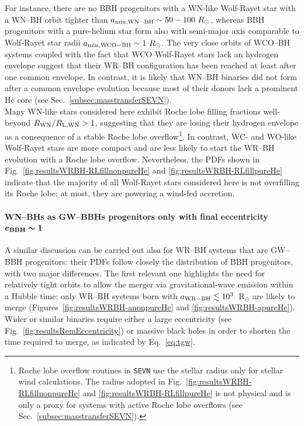 \documentclass[a4paper,titlepage]{book}     	%
\newcommand{\rsun}{R_{\odot}}
\begin{document}
For instance, there are no BBH progenitors with a WN-like Wolf-Rayet star with a WN--BH orbit tighter than $a_{\rm min, WN-BH} \sim 50-100~\rsun$, whereas BBH progenitors with a pure-helium star form also with semi-major axis comparable to Wolf-Rayet star radii $a_{\rm min, WCO-BH} \sim 1~\rsun$. The very close orbits of WCO--BH systems coupled with the fact that WCO Wolf-Rayet stars lack an hydrogen envelope suggest that their WR--BH configuration has been reached at least after one common envelope. In contrast, it is likely that WN--BH binaries did not form after a common envelope evolution because most of their donors lack a prominent He core (see Sec.\ \ref{subsec:masstransferSEVN}).\\

Many WN-like stars considered here exhibit Roche lobe filling fractions well-beyond $R_{\rm WN}/R_{\rm L,WN} > 1$, suggesting that they are losing their hydrogen envelope as a consequence of a stable Roche lobe overflow\footnote{Roche lobe overflow routines in \texttt{SEVN} use the stellar radius only for stellar wind calculations. The radius adopted in Fig.\ \ref{fig:resultsWRBH-RLfillnonpureHe} and \ref{fig:resultsWRBH-RLfillpureHe} is not physical and is only a proxy for systems with active Roche lobe overflows (see Sec.\ \ref{subsec:masstransferSEVN}).}. In contrast, WC- and WO-like Wolf-Rayet stars are more compact and are less likely to start the WR--BH evolution with a Roche lobe overflow. Nevertheless, the PDFs shown in Fig.\ \ref{fig:resultsWRBH-RLfillnonpureHe} and \ref{fig:resultsWRBH-RLfillpureHe} indicate that the majority of all Wolf-Rayet stars considered here is not overfilling its Roche lobe: at most, they are powering a wind-fed accretion.



\paragraph{WN--BHs as GW--BBHs progenitors only with final eccentricity $\boldsymbol{e_{\rm BBH} \sim 1}$} A similar discussion can be carried out also for WR--BH systems that are GW--BBH progenitors: their PDFs follow closely the distribution of BBH progenitors, with two major differences. The first relevant one highlights the need for relatively tight orbits to allow the merger via gravitational-wave emission within a Hubble time: only WR--BH systems born with $a_{\rm WR-BH} \lesssim 10^3$~R$_\odot$ are likely to merge (Figures~\ref{fig:resultsWRBH-anonpureHe} and \ref{fig:resultsWRBH-apureHe}). Wider or similar binaries require either a large eccentricity (see Fig.\ \ref{fig:resultsRemEccentricity}) or massive black holes in order to shorten the time required to merge, as indicated by Eq.\ \ref{eq:tgw}. 
\end{document}

